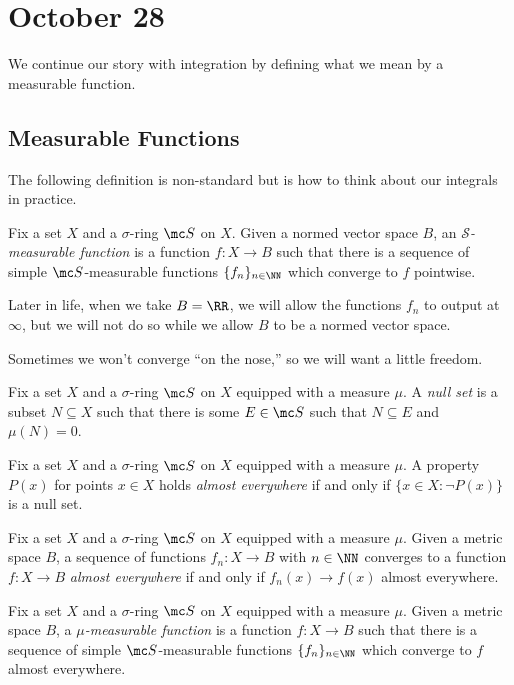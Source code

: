 \documentclass[../notes.tex]{subfiles}
\begin{document}
\section{October 28}

We continue our story with integration by defining what we mean by a measurable function.

\subsection{Measurable Functions}
The following definition is non-standard but is how to think about our integrals in practice.
\begin{definition}
	Fix a set $X$ and a $\sigma$-ring $\mc S$ on $X$. Given a normed vector space $B$, an \textit{$\mathcal S$-measurable function} is a function $f\colon X\to B$ such that there is a sequence of simple $\mc S$-measurable functions $\{f_n\}_{n\in\NN}$ which converge to $f$ pointwise.
\end{definition}
\begin{remark}
	Later in life, when we take $B=\RR$, we will allow the functions $f_n$ to output at $\infty$, but we will not do so while we allow $B$ to be a normed vector space.
\end{remark}
Sometimes we won't converge ``on the nose,'' so we will want a little freedom.
\begin{definition}
	Fix a set $X$ and a $\sigma$-ring $\mc S$ on $X$ equipped with a measure $\mu$. A \textit{null set} is a subset $N\subseteq X$ such that there is some $E\in\mc S$ such that $N\subseteq E$ and $\mu(N)=0$.
\end{definition}
\begin{definition}
	Fix a set $X$ and a $\sigma$-ring $\mc S$ on $X$ equipped with a measure $\mu$. A property $P(x)$ for points $x\in X$ holds \textit{almost everywhere} if and only if $\{x\in X:\lnot P(x)\}$ is a null set.
\end{definition}
\begin{definition}
	Fix a set $X$ and a $\sigma$-ring $\mc S$ on $X$ equipped with a measure $\mu$. Given a metric space $B$, a sequence of functions $f_n\colon X\to B$ with $n\in\NN$ converges to a function $f\colon X\to B$ \textit{almost everywhere} if and only if $f_n(x)\to f(x)$ almost everywhere.
\end{definition}
\begin{definition}
	Fix a set $X$ and a $\sigma$-ring $\mc S$ on $X$ equipped with a measure $\mu$. Given a metric space $B$, a \textit{$\mu$-measurable function} is a function $f\colon X\to B$ such that there is a sequence of simple $\mc S$-measurable functions $\{f_n\}_{n\in\NN}$ which converge to $f$ almost everywhere.
\end{definition}
\end{document}
